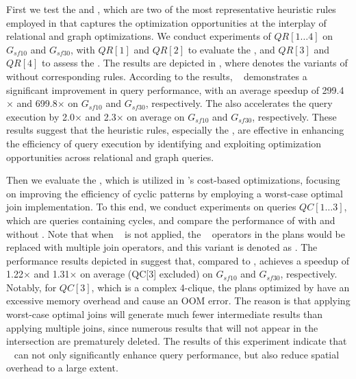 First we test the \filterrule and \joinfuserule, which are two of the most representative heuristic rules employed in \name that captures the optimization opportunities at the interplay of relational and graph optimizations.
We conduct experiments of $QR[1\dots 4]$ on $G_{sf10}$ and $G_{sf30}$, with $QR[1]$ and $QR[2]$ to evaluate the \filterrule, and $QR[3]$ and $QR[4]$ to assess the \joinfuserule.
The results are depicted in , where \relgonofi denotes the variants of \name without corresponding rules.
According to the results, \filterrule~ demonstrates a significant improvement in query performance, with an average speedup of 299.4$\times$ and 699.8$\times$ on $G_{sf10}$ and $G_{sf30}$, respectively.
The \joinfuserule also accelerates the query execution by 2.0$\times$ and 2.3$\times$ on average on $G_{sf10}$ and $G_{sf30}$, respectively.
These results suggest that the heuristic rules, especially the \filterrule, are effective in enhancing the efficiency of query execution by identifying and exploiting optimization opportunities across relational and graph queries.

Then we evaluate the \expandintersectrule, which is utilized in \name's cost-based optimizations, focusing on improving the efficiency of cyclic patterns by employing a worst-case optimal join implementation.
To this end, we conduct experiments on queries $QC[1\ldots 3]$, which are queries containing cycles, and compare the performance of \name with and without \expandintersectrule.
Note that when \expandintersectrule~ is not applied, the \intersect~ operators in the plans would be replaced with multiple join operators, and this variant is denoted as \relgomj.
The performance results depicted in  suggest that, compared to \relgomj, \name achieves a speedup of 1.22$\times$ and 1.31$\times$ on average (QC[3] excluded) on $G_{sf10}$ and $G_{sf30}$, respectively.
Notably, for $QC[3]$, which is a complex 4-clique, the plans optimized by \relgomj have an excessive memory overhead and cause an OOM error.
The reason is that applying worst-case optimal joins will generate much fewer intermediate results than applying multiple joins, since numerous results that will not appear in the intersection are prematurely deleted.
The results of this experiment indicate that \expandintersectrule~ can not only significantly enhance query performance, but also reduce spatial overhead to a large extent.

